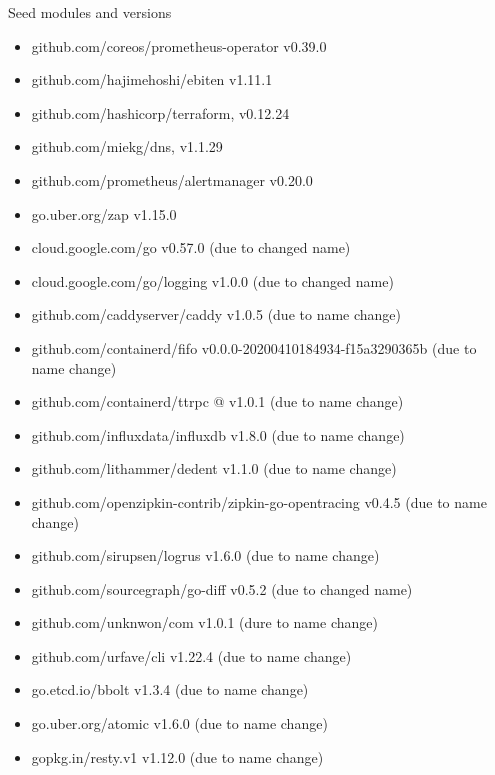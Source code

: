 \begin{table}[ht]
  \caption{Seed modules and versions}
  \label{table:seed}
  \begin{itemize}
  \item github.com/coreos/prometheus-operator v0.39.0
  \item github.com/hajimehoshi/ebiten v1.11.1
  \item github.com/hashicorp/terraform, v0.12.24
  \item github.com/miekg/dns, v1.1.29
  \item github.com/prometheus/alertmanager v0.20.0
  \item go.uber.org/zap v1.15.0

  \item cloud.google.com/go  v0.57.0 (due to changed name)
  \item cloud.google.com/go/logging v1.0.0 (due to changed name)
  \item github.com/caddyserver/caddy v1.0.5 (due to name change)
  \item github.com/containerd/fifo v0.0.0-20200410184934-f15a3290365b (due to name change)
  \item github.com/containerd/ttrpc @ v1.0.1 (due to name change)
  \item github.com/influxdata/influxdb v1.8.0 (due to name change)
  \item github.com/lithammer/dedent v1.1.0 (due to name change)
  \item github.com/openzipkin-contrib/zipkin-go-opentracing v0.4.5 (due to name change)
  \item github.com/sirupsen/logrus v1.6.0 (due to name change)
  \item github.com/sourcegraph/go-diff v0.5.2 (due to changed name)
  \item github.com/unknwon/com v1.0.1 (dure to name change)
  \item github.com/urfave/cli v1.22.4 (due to name change)
  \item go.etcd.io/bbolt v1.3.4 (due to name change)
  \item go.uber.org/atomic v1.6.0 (due to name change)
  \item gopkg.in/resty.v1 v1.12.0 (due to name change)
    
  \end{itemize}
\end{table}
